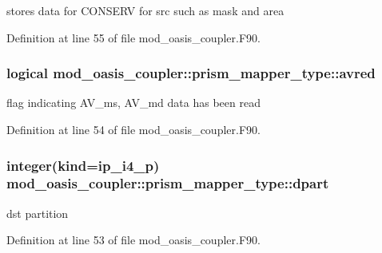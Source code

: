 stores data for C\+O\+N\+S\+E\+R\+V for src such as mask and area 



Definition at line 55 of file mod\+\_\+oasis\+\_\+coupler.\+F90.

\hypertarget{structmod__oasis__coupler_1_1prism__mapper__type_a43703d30f4439aeab0b9e3fc7e588486}{
\subsubsection[{avred}]{\setlength{\rightskip}{0pt plus 5cm}logical mod\+\_\+oasis\+\_\+coupler\+::prism\+\_\+mapper\+\_\+type\+::avred\hspace{0.3cm}{\ttfamily [private]}}}\label{structmod__oasis__coupler_1_1prism__mapper__type_a43703d30f4439aeab0b9e3fc7e588486}


flag indicating A\+V\+\_\+ms, A\+V\+\_\+md data has been read 



Definition at line 54 of file mod\+\_\+oasis\+\_\+coupler.\+F90.

\hypertarget{structmod__oasis__coupler_1_1prism__mapper__type_a51bdf1e868cc738ca424cf533266240e}{
\subsubsection[{dpart}]{\setlength{\rightskip}{0pt plus 5cm}integer(kind=ip\+\_\+i4\+\_\+p) mod\+\_\+oasis\+\_\+coupler\+::prism\+\_\+mapper\+\_\+type\+::dpart\hspace{0.3cm}{\ttfamily [private]}}}\label{structmod__oasis__coupler_1_1prism__mapper__type_a51bdf1e868cc738ca424cf533266240e}


dst partition 



Definition at line 53 of file mod\+\_\+oasis\+\_\+coupler.\+F90.

